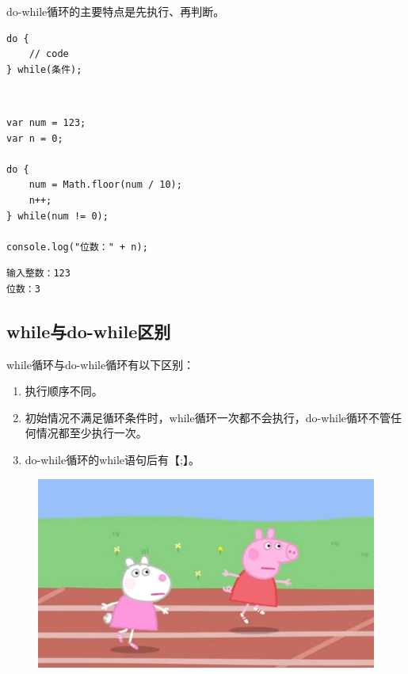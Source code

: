 do-while循环的主要特点是先执行、再判断。 \\

\begin{lstlisting}[style=htmlcssjs]
do {
    // code
} while(条件);
\end{lstlisting}

\vspace{0.5cm}

 \\

\begin{lstlisting}[style=htmlcssjs]
var num = 123;
var n = 0;

do {
    num = Math.floor(num / 10);
    n++;
} while(num != 0);

console.log("位数：" + n);
\end{lstlisting}

\begin{tcolorbox}
	\begin{verbatim}
输入整数：123
位数：3
	\end{verbatim}
\end{tcolorbox}

\subsection{while与do-while区别}

while循环与do-while循环有以下区别：

\begin{enumerate}
	\item 执行顺序不同。

	\item 初始情况不满足循环条件时，while循环一次都不会执行，do-while循环不管任何情况都至少执行一次。

	\item do-while循环的while语句后有【;】。
\end{enumerate}

\begin{figure}[H]
	\centering
	\includegraphics[scale=0.2]{img/C11/11-3/1.png}
\end{figure}

